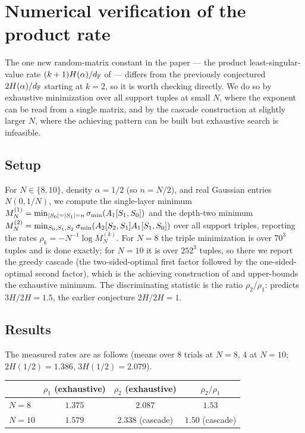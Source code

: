 \section{Numerical verification of the product rate}\label{sec:numerics}

The one new random-matrix constant in the paper --- the product least-singular-value rate
$(k+1)H(\alpha)/d_{\mathbb{F}}$ of  --- differs from the previously conjectured $2H(\alpha)/d_{\mathbb{F}}$
starting at $k=2$, so it is worth checking directly. We do so by exhaustive minimization over all
support tuples at small $N$, where the exponent can be read from a single matrix, and by the cascade
construction at slightly larger $N$, where the achieving pattern can be built but exhaustive search is
infeasible.

\subsection{Setup}
For $N\in\{8,10\}$, density $\alpha=1/2$ (so $n=N/2$), and real Gaussian entries $N(0,1/N)$, we compute
the single-layer minimum $M_N^{(1)}=\min_{|S_0|=|S_1|=n}\sigma_{\min}(A_1[S_1,S_0])$ and the depth-two minimum
$M_N^{(2)}=\min_{S_0,S_1,S_2}\sigma_{\min}(A_2[S_2,S_1]A_1[S_1,S_0])$ over all support triples, reporting the
rates $\rho_k=-N^{-1}\log M_N^{(k)}$. For $N=8$ the triple minimization is over $70^3$ tuples and is
done exactly; for $N=10$ it is over $252^3$ tuples, so there we report the greedy cascade (the
two-sided-optimal first factor followed by the one-sided-optimal second factor), which is the
achieving construction of  and upper-bounds the exhaustive minimum. The discriminating
statistic is the ratio $\rho_2/\rho_1$:  predicts $3H/2H=1.5$, the earlier conjecture
$2H/2H=1$.

\subsection{Results}
The measured rates are as follows (means over $8$ trials at $N=8$, $4$ at $N=10$; $2H(1/2)=1.386$,
$3H(1/2)=2.079$).

\begin{center}
\renewcommand{\arraystretch}{1.2}
\begin{tabular}{@{}lccc@{}}
\toprule
 & $\rho_1$ (exhaustive) & $\rho_2$ (exhaustive) & $\rho_2/\rho_1$ \\
\midrule
$N=8$  & $1.375$ & $2.087$ & $1.53$ \\
$N=10$ & $1.579$ & $2.338$ (cascade) & $1.50$ (cascade) \\
\bottomrule
\end{tabular}
\end{center}

